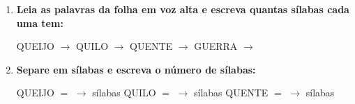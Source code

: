 \begin{exercicio}
\begin{enumerate}[resume]
  \item \textbf{Leia as palavras da folha em voz alta e escreva quantas sílabas cada uma tem:}

  \begin{center}
  QUEIJO $\rightarrow$ \underline{\hspace{1cm}} \quad QUILO $\rightarrow$ \underline{\hspace{1cm}} \quad QUENTE $\rightarrow$ \underline{\hspace{1cm}} \quad GUERRA $\rightarrow$ \underline{\hspace{1cm}}
  \end{center}

  \item \textbf{Separe em sílabas e escreva o número de sílabas:}
  \begin{center}
  QUEIJO $=$ \underline{\hspace{1.2cm}} $\rightarrow$ \underline{\hspace{0.8cm}} sílabas \quad QUILO $=$ \underline{\hspace{1.2cm}} $\rightarrow$ \underline{\hspace{0.8cm}} sílabas \quad QUENTE $=$ \underline{\hspace{1.2cm}} $\rightarrow$ \underline{\hspace{0.8cm}} sílabas
  \end{center}

\end{enumerate}

\end{exercicio}



